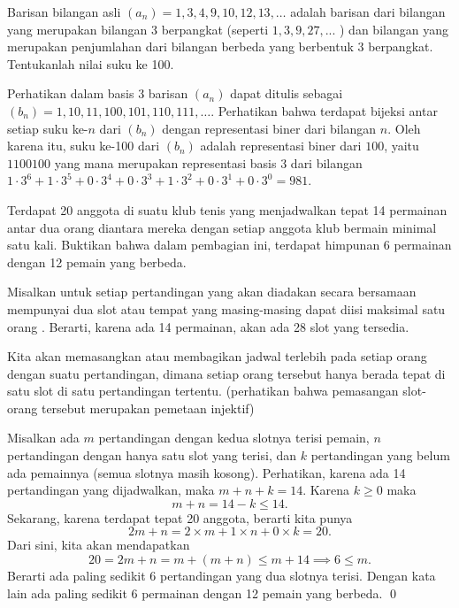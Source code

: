 \documentclass[11pt]{scrartcl}
\begin{document}
\begin{soaljawab}
Barisan bilangan asli $(a_n) = 1,3,4,9,10,12,13,\dots$ adalah barisan dari bilangan yang merupakan bilangan 3 berpangkat (seperti $1,3,9,27,...$ ) dan bilangan yang merupakan penjumlahan dari bilangan berbeda yang berbentuk 3 berpangkat. Tentukanlah nilai suku ke 100.
\begin{solusi}
    Perhatikan dalam basis 3 barisan $(a_n)$ dapat ditulis sebagai $(b_n) =1,10,11,100,101,110,111,\dots$. Perhatikan bahwa terdapat bijeksi antar setiap suku ke-$n$ dari $(b_n)$ dengan representasi biner dari bilangan $n$. Oleh karena itu, suku ke-100 dari $(b_n)$ adalah representasi biner dari $100$, yaitu $1100100$ yang mana merupakan representasi basis 3 dari bilangan $1\cdot3^6+1\cdot3^5+0\cdot3^4+0\cdot3^3+1\cdot3^2+0\cdot3^1+0\cdot3^0=\boxed{981}$.
\end{solusi}
\end{soaljawab}

\begin{soaljawab}
Terdapat 20 anggota di suatu klub tenis yang menjadwalkan tepat 14 permainan antar dua orang diantara mereka dengan setiap anggota klub bermain minimal satu kali. Buktikan bahwa dalam pembagian ini, terdapat himpunan 6 permainan dengan 12 pemain yang berbeda.\\
	
\begin{solusi}
    Misalkan untuk setiap pertandingan yang akan diadakan secara bersamaan mempunyai dua slot atau tempat yang masing-masing dapat diisi maksimal satu orang . Berarti, karena ada 14 permainan, akan ada 28 slot yang tersedia.
    
    Kita akan memasangkan atau membagikan jadwal terlebih pada setiap orang dengan suatu pertandingan, dimana setiap orang tersebut hanya berada tepat di satu slot di satu pertandingan tertentu. (perhatikan bahwa pemasangan slot-orang tersebut merupakan pemetaan injektif)
    
    
     Misalkan ada $m$ pertandingan dengan kedua slotnya terisi pemain, $n$ pertandingan dengan hanya satu slot yang terisi, dan $k$ pertandingan yang belum ada pemainnya (semua slotnya masih kosong). Perhatikan, karena ada 14 pertandingan yang dijadwalkan, maka $m+n+k=14$. Karena $k \ge 0$ maka $$m+n=14-k \le 14.$$
     Sekarang, karena terdapat tepat 20 anggota, berarti kita punya $$2m+n=2\times m+1 \times n+0 \times k =20.$$ Dari sini, kita akan mendapatkan $$20=2m+n=m+(m+n) \le m + 14 \implies 6 \le m.$$ Berarti ada paling sedikit 6 pertandingan yang dua slotnya terisi. Dengan kata lain ada paling sedikit 6 permainan dengan 12 pemain yang berbeda. \qed
\end{solusi}
\end{soaljawab}
\end{document}
